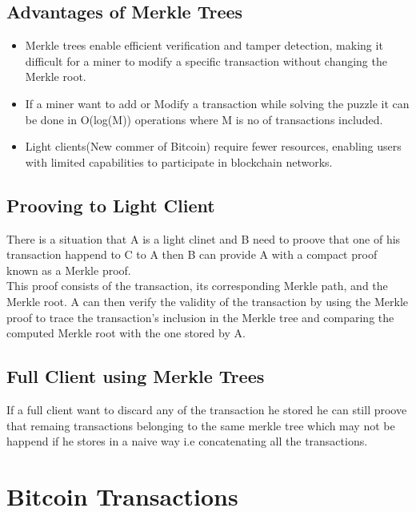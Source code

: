 \documentclass{report}
\begin{document}
\subsection{Advantages of Merkle Trees}
\begin{itemize}
    \item Merkle trees enable efficient verification and tamper detection, making it difficult for a miner to modify a specific transaction without changing the Merkle root.
    \item If a miner want to add or Modify a transaction while solving the puzzle it can be done in O(log(M)) operations where M is no of transactions included.
    \item Light clients(New commer of Bitcoin) require fewer resources, enabling users with limited capabilities to participate in blockchain networks.
\end{itemize}
\subsection{Prooving to Light Client}
There is a situation that A is a light clinet and B need to proove that one of his transaction happend to C to A then B can provide A with a compact proof known as a Merkle proof. \\
This proof consists of the transaction, its corresponding Merkle path, and the Merkle root. A can then verify the validity of the transaction by using the Merkle proof to trace the transaction's inclusion in the Merkle tree and comparing the computed Merkle root with the one stored by A.
\subsection{Full Client using Merkle Trees}
If a full client want to discard any of the transaction he stored he can still proove that remaing transactions belonging to the same merkle tree which may not be happend if he stores in a naive way i.e concatenating all the transactions.
\section{Bitcoin Transactions}
\end{document}
